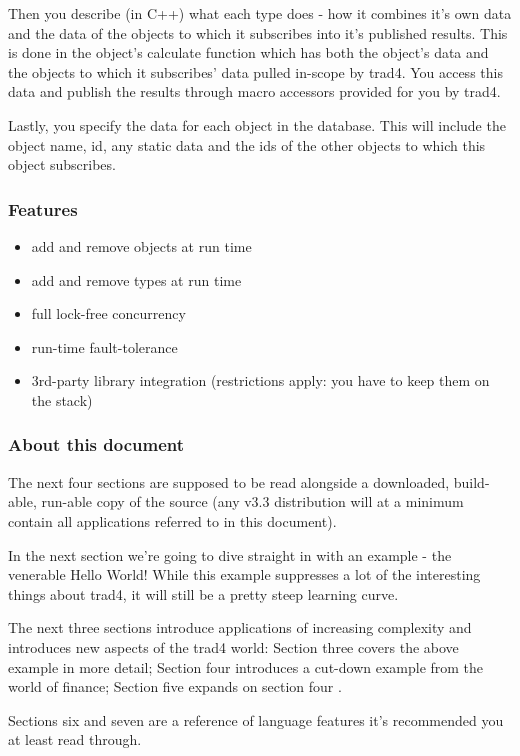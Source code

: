 \documentclass{report}
\begin{document}
Then you describe (in C++) what each type does - how it combines it's own data and the data of the objects to which it subscribes into it's published results. This is done in the object's calculate function which has both the object's data and the objects to which it subscribes' data pulled in-scope by trad4. You access this data and publish the results through macro accessors provided for you by trad4.

Lastly, you specify the data for each object in the database. This will include the object name, id, any static data and the ids of the other objects to which this object subscribes.

\subsubsection{Features}

\begin{itemize}
\item add and remove objects at run time
\item add and remove types at run time
\item full lock-free concurrency
\item run-time fault-tolerance
\item 3rd-party library integration (restrictions apply: you have to keep them on the stack)
\end{itemize}

\subsubsection{About this document}

The next four sections are supposed to be read alongside a downloaded, build-able, run-able copy of the source (any v3.3 distribution will at a minimum contain all applications referred to in this document).

In the next section we're going to dive straight in with an example - the venerable Hello World! While this example suppresses a lot of the interesting things about trad4, it will still be a pretty steep learning curve.

The next three sections introduce applications of increasing complexity and introduces new aspects of the trad4 world: Section three covers the above example in more detail; Section four introduces a cut-down example from the world of finance; Section five expands on section four .

Sections six and seven are a reference of language features it's recommended you at least read through.
\end{document}
